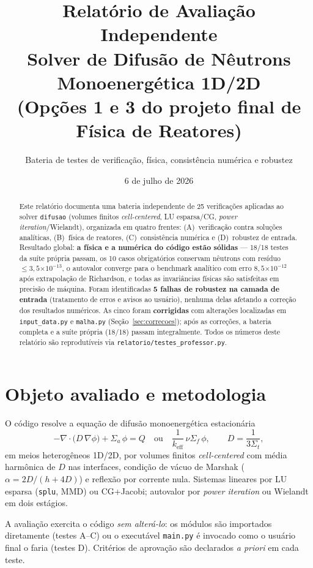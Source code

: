 \documentclass[11pt,a4paper]{article}
\title{Relatório de Avaliação Independente\\
\large Solver de Difusão de Nêutrons Monoenergética 1D/2D\\
(Opções 1 e 3 do projeto final de Física de Reatores)}
\author{Bateria de testes de verificação, física, consistência numérica e robustez}
\date{6 de julho de 2026}
\newcommand{\keff}{k_{\text{eff}}}
\newcommand{\e}[1]{\ensuremath{\times 10^{#1}}}
\begin{document}
\maketitle

\begin{abstract}
Este relatório documenta uma bateria independente de 25 verificações aplicadas ao
solver \texttt{difusao} (volumes finitos \emph{cell-centered}, LU esparsa/CG,
\emph{power iteration}/Wielandt), organizada em quatro frentes: (A)~verificação
contra soluções analíticas, (B)~física de reatores, (C)~consistência numérica e
(D)~robustez de entrada. Resultado global: \textbf{a física e a numérica do
código estão sólidas} --- 18/18 testes da suíte própria passam, os 10 casos
obrigatórios conservam nêutrons com resíduo $\leq 3{,}5\e{-13}$, o autovalor
converge para o benchmark analítico com erro $8{,}5\e{-12}$ após extrapolação de
Richardson, e todas as invariâncias físicas são satisfeitas em precisão de
máquina. Foram identificadas \textbf{5 falhas de robustez na camada de entrada}
(tratamento de erros e avisos ao usuário), nenhuma delas afetando a correção dos
resultados numéricos. As cinco foram \textbf{corrigidas} com alterações
localizadas em \texttt{input\_data.py} e \texttt{malha.py}
(Seção~\ref{sec:correcoes}); após as correções, a bateria completa e a suíte
própria (18/18) passam integralmente. Todos os números deste relatório são
reprodutíveis via \texttt{relatorio/testes\_professor.py}.
\end{abstract}

\section{Objeto avaliado e metodologia}

O código resolve a equação de difusão monoenergética estacionária
\begin{equation}
-\nabla\!\cdot\!\bigl(D\,\nabla\phi\bigr) + \Sigma_a\,\phi
  = Q \quad\text{ou}\quad \frac{1}{\keff}\,\nu\Sigma_f\,\phi,
\qquad D = \frac{1}{3\Sigma_t},
\end{equation}
em meios heterogêneos 1D/2D, por volumes finitos \emph{cell-centered} com média
harmônica de $D$ nas interfaces, condição de vácuo de Marshak
($\alpha = 2D/(h+4D)$) e reflexão por corrente nula. Sistemas lineares por LU
esparsa (\texttt{splu}, MMD) ou CG+Jacobi; autovalor por \emph{power iteration}
ou Wielandt em dois estágios.

A avaliação exercita o código \emph{sem alterá-lo}: os módulos são importados
diretamente (testes A--C) ou o executável \texttt{main.py} é invocado como o
usuário final o faria (testes D). Critérios de aprovação são declarados
\emph{a priori} em cada teste.
\end{document}
